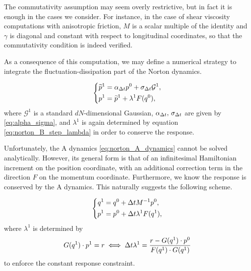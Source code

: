 \begin{remark}
    The commutativity assumption may seem overly restrictive, but in fact it is enough in the cases we consider. 
    For instance, in the case of shear viscosity computations with anisotropic friction, $M$ is a scalar multiple of the identity and $\gamma$ is diagonal and constant with respect to longitudinal coordinates, so that the commutativity condition is indeed verified.
\end{remark}

As a consequence of this computation, we may define a numerical strategy to integrate the fluctuation-dissipation part of the Norton dynamics.

\begin{algorithm}
    \begin{equation}
        \label{eq:norton_O_step}
        \left\{
            \begin{aligned}
                \widetilde{p}^{1} &= \alpha_{{\Delta t}}p^0 +\sigma_{{\Delta t}}\mathcal G^1,\\
                p^{1} &= \widetilde{p}^{1} + \lambda^{1} F(q^{0}),
            \end{aligned}
        \right.
    \end{equation}
    where $\mathcal G^1$ is a standard $dN$-dimensional Gaussian, $\alpha_{\Delta t},\,\sigma_{\Delta t} $ are given by \eqref{eq:alpha_sigma}, and $\lambda^{1}$ is again determined by equation \eqref{eq:norton_B_step_lambda} in order to conserve the response.
\end{algorithm}

Unfortunately, the A dynamics \eqref{eq:norton_A_dynamics} cannot be solved analytically. 
However, its general form is that of an infinitesimal Hamiltonian increment on the position coordinate, with an additional correction term in the direction $F$ on the momentum coordinate. 
Furthermore, we know the response is conserved by the A dynamics. This naturally suggests the following scheme.

\begin{algorithm}
    \begin{equation}
        \label{eq:norton_A_step}
        \left\{\begin{aligned}
            q^1 &= q^0 + {\Delta t} M^{-1}p^0, \\
            p^1 &= p^0 +{\Delta t}\lambda^{1} F(q^1),
        \end{aligned}\right.
    \end{equation}
where $\lambda^{1}$ is determined by 
\begin{equation}
    \label{eq:norton_A_step_lambda}
    G(q^1)\cdot p^{1} = r \iff {\Delta t}\lambda^{1} = \frac{r-G(q^1)\cdot p^0}{F(q^1)\cdot G(q^1)}
\end{equation}
to enforce the constant response constraint.
\end{algorithm}

